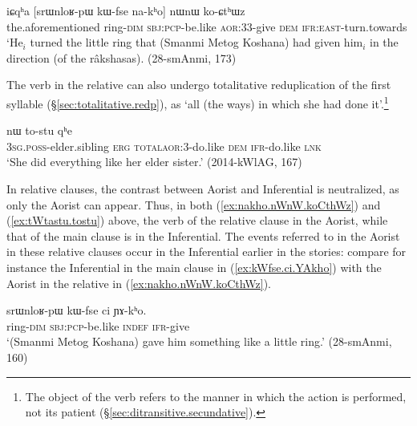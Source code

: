 \begin{exe}
\ex \label{ex:nakho.nWnW.koCthWz}
\gll iɕqʰa [srɯnloʁ-pɯ kɯ-fse na-kʰo] nɯnɯ ko-ɕtʰɯz \\
the.aforementioned ring-\textsc{dim} \textsc{sbj}:\textsc{pcp}-be.like \textsc{aor}:3\fl{}3-give \textsc{dem} \textsc{ifr}:\textsc{east}-turn.towards \\
\glt `He$_i$ turned the little ring that (Smanmi Metog Koshana) had given him$_i$ in the direction (of the râkshasas). (28-smAnmi, 173)
\end{exe}

The verb in the relative can also undergo totalitative reduplication of the first syllable (§\ref{sec:totalitative.redp}), as  `all (the ways) in which she had done it'.\footnote{The object of the verb  refers to the manner in which the action is performed, not its patient (§\ref{sec:ditransitive.secundative}). }

\begin{exe}
\ex \label{ex:tWtastu.tostu}
 nɯ to-stu qʰe \\
\textsc{3sg}.\textsc{poss}-elder.sibling \textsc{erg} \textsc{total}\redp{}\textsc{aor}:3\flobv{}-do.like \textsc{dem} \textsc{ifr}-do.like \textsc{lnk} \\
\glt `She did everything like her elder sister.' (2014-kWlAG, 167)
\end{exe}

In relative clauses, the contrast between Aorist and Inferential is neutralized, as only the Aorist can appear. Thus, in both (\ref{ex:nakho.nWnW.koCthWz}) and (\ref{ex:tWtastu.tostu}) above, the verb of the relative clause in the Aorist, while that of the main clause is in the Inferential. The events referred to in the Aorist in these relative clauses occur in the Inferential earlier in the stories: compare for instance the Inferential  in the main clause in (\ref{ex:kWfse.ci.YAkho}) with the Aorist  in the relative in (\ref{ex:nakho.nWnW.koCthWz}).

\begin{exe}
\ex \label{ex:kWfse.ci.YAkho}
\gll srɯnloʁ-pɯ kɯ-fse ci ɲɤ-kʰo. \\
 ring-\textsc{dim} \textsc{sbj}:\textsc{pcp}-be.like \textsc{indef} \textsc{ifr}-give \\
 \glt `(Smanmi Metog Koshana) gave him something like a little ring.' (28-smAnmi, 160)
\end{exe}

